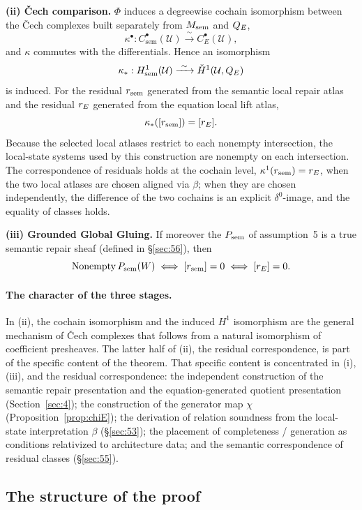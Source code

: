 \begin{theorem}
\textbf{(ii) \v{C}ech comparison.} $\Phi$ induces a degreewise cochain
isomorphism between the \v{C}ech complexes built separately from
$M_{\mathrm{sem}}$ and $Q_{E}$,
\[
\kappa^\bullet:
C^\bullet_{\mathrm{sem}}(\mathcal U)
\xrightarrow{\ \sim\ }
C^\bullet_E(\mathcal U),
\]
and $\kappa$ commutes with the differentials. Hence an isomorphism
\[
\kappa_*:
H^1_{\mathrm{sem}}(\mathcal U)
\xrightarrow{\ \sim\ }
\check H^1(\mathcal U,Q_{E})
\]
is induced. For the residual $r_{\mathrm{sem}}$ generated from the semantic local
repair atlas and the residual $r_{E}$ generated from the equation
local lift atlas,
\[
\kappa_*([r_{\mathrm{sem}}])=[r_{E}].
\]
Because the selected local atlases restrict to each nonempty
intersection, the local-state systems used by this construction are
nonempty on each intersection. The correspondence of residuals holds at the
cochain level, $\kappa^1(r_{\mathrm{sem}})=r_{E}$, when the two local atlases are
chosen aligned via $\beta$; when they are chosen independently, the
difference of the two cochains is an explicit $\delta^0$-image, and the
equality of classes holds.

\textbf{(iii) Grounded Global Gluing.} If moreover the $P_{\mathrm{sem}}$ of
assumption~5 is a true semantic repair sheaf (defined in
\S\ref{sec:56}), then
\[
\mathrm{Nonempty}\,P_{\mathrm{sem}}(W)
\iff
[r_{\mathrm{sem}}]=0
\iff
[r_{E}]=0.
\]
\end{theorem}

\paragraph{The character of the three stages.}
In (ii), the cochain isomorphism and the induced $H^1$ isomorphism are
the general mechanism of \v{C}ech complexes that follows from a natural
isomorphism of coefficient presheaves. The latter half of (ii), the
residual correspondence, is part of the specific content of the theorem.
That specific content is concentrated in (i), (iii), and the residual
correspondence: the independent construction of the semantic repair
presentation and the equation-generated quotient presentation
(Section~\ref{sec:4}); the construction of the generator map $\chi$
(Proposition~\ref{prop:chiE}); the derivation of relation soundness
from the local-state interpretation $\beta$ (\S\ref{sec:53}); the
placement of completeness / generation as conditions relativized to
architecture data; and the semantic correspondence of residual classes
(\S\ref{sec:55}).

\subsection{The structure of the proof}\label{sec:52}

